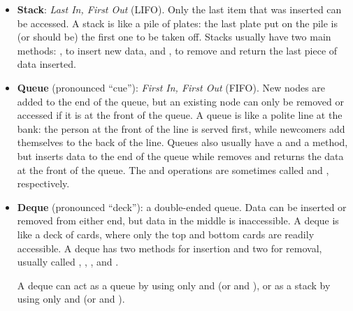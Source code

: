 \begin{itemize}
\item \textbf{Stack}: \emph{Last In, First Out} (LIFO).
Only the last item that was inserted can be accessed.
A stack is like a pile of plates: the last plate put on the pile is (or should be) the first one to be taken off.
Stacks usually have two main methods: , to insert new data, and , to remove and return the last piece of data inserted.

\item \textbf{Queue} (pronounced ``cue''): \emph{First In, First Out} (FIFO).
New nodes are added to the end of the queue, but an existing node can only be removed or accessed if it is at the front of the queue.
A queue is like a polite line at the bank: the person at the front of the line is served first, while newcomers add themselves to the back of the line.
Queues also usually have a  and a  method, but  inserts data to the end of the queue while  removes and returns the data at the front of the queue.
The  and  operations are sometimes called  and , respectively.

\item \textbf{Deque} (pronounced ``deck''): a double-ended queue.
Data can be inserted or removed from either end, but data in the middle is inaccessible.
A deque is like a deck of cards, where only the top and bottom cards are readily accessible.
A deque has two methods for insertion and two for removal, usually called , , , and .

A deque can act as a queue by using only  and  (or  and ), or as a stack by using only  and  (or  and ).
\end{itemize}

